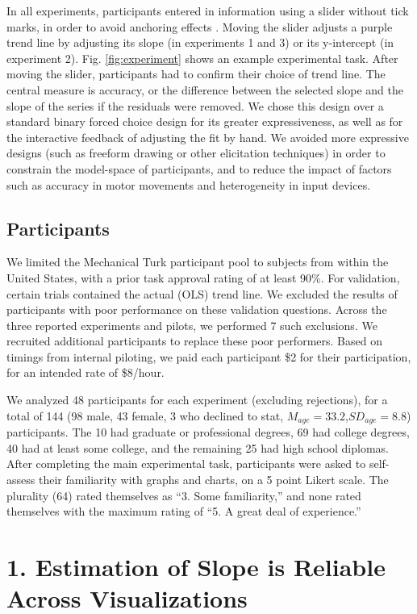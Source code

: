 \documentclass{sigchi}
\begin{document}
In all experiments, participants entered in information using a slider without tick marks, in order to avoid anchoring effects \cite{matejka2016effect}. Moving the slider adjusts a purple trend line by adjusting its slope (in experiments 1 and 3) or its y-intercept (in experiment 2). Fig. \ref{fig:experiment} shows an example experimental task. After moving the slider, participants had to confirm their choice of trend line. The central measure is accuracy, or the difference between the selected slope and the slope of the series if the residuals were removed. We chose this design over a standard binary forced choice design for its greater expressiveness, as well as for the interactive feedback of adjusting the fit by hand. We avoided more expressive designs (such as freeform drawing or other elicitation techniques) in order to constrain the model-space of participants, and to reduce the impact of factors such as accuracy in motor movements and heterogeneity in input devices.

\subsection{Participants}

We limited the Mechanical Turk participant pool to subjects from within the United States, with a prior task approval rating of at least 90\%. For validation, certain trials contained the actual (OLS) trend line. We excluded the results of participants with poor performance on these validation questions. Across the three reported experiments and pilots, we performed 7 such exclusions. We recruited additional participants to replace these poor performers. Based on timings from internal piloting, we paid each participant \$2 for their participation, for an intended rate of \$8/hour.

We analyzed 48 participants for each experiment (excluding rejections), for a total of 144 (98 male, 43 female, 3 who declined to stat, $M_{age}= 33.2$,$SD_{age}=8.8$) participants. The 10 had graduate or professional degrees, 69 had college degrees, 40 had at least some college, and the remaining 25 had high school diplomas. After completing the main experimental task, participants were asked to self-assess their familiarity with graphs and charts, on a 5 point Likert scale. The plurality (64) rated themselves as ``3. Some familiarity,'' and none rated themselves with the maximum rating of ``5. A great deal of experience.''

\section{1. Estimation of Slope is Reliable \\ Across Visualizations}
\end{document}
